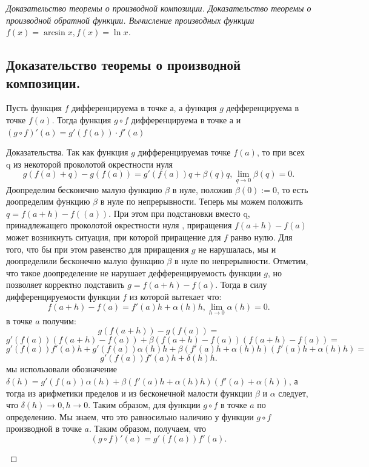 
\label{sec_Proofs06}
\begin{proof}[Доказательство теоремы о производной композиции. Доказательство теоремы о производной обратной функции. Вычисление производных функции $f(x) = \arcsin x, f(x) = \ln x$]
    \subsection*{Доказательство теоремы о производной композиции.}
    \begin{note}[amber]
        Пусть функция $f$ дифференцируема в точке а, а функция $g$ дефференцируема в точке $f(a)$. Тогда функция $g \circ f$ дифференцируема в точке а и $(g \circ f)'(a) = g'(f(a)) \cdot f'(a)$\\
        \begin{note}[purple]
           Доказательства. Так как функция $g$ дифференцируемав точке $f(a)$, то при всех q из некоторой проколотой окрестности нуля
           \[
           g(f(a) + q) - g(f(a)) = g'(f(a))q + \beta (q)q, \lim_{q \to 0} \beta(q) = 0.
           \]
           Доопределим бесконечно малую функцию $\beta$ в нуле, положив $\beta(0) := 0$, то есть доопределим функцию $\beta$
           в нуле по непрерывности. Теперь мы можем положить $q = f(a+h) - f((a))$. При этом при подстановки вместо q, принадлежащего проколотой окрестности нуля , приращения $f(a+h)-f(a)$ может возникнуть ситуация, при которой приращение для $f$ ранво нулю.
           Для того, что бы при этом равенство для приращения $g$ не нарушалась, мы и доопределили бесконечно малую функцию $\beta$ в нуле по непрерывности. Отметим, что такое доопределение не нарушает дефференцируемость функции $g$,
           но позволяет корректно подставить $g = f(a+h)-f(a)$.
           Тогда в силу дифференцируемости функции $f$ из которой вытекает что:
           \[
           f(a+h)-f(a) = f'(a)h + \alpha(h)h, \lim_{h \to 0} \alpha(h) = 0.
           \]
           в точке $a$ получим:
           \[
            g(f(a+h))-g(f(a)) = 
            \]
            \[
            g'(f(a))(f(a+h)-f(a)) + \beta(f(a+h)-f(a))(f(a+h)-f(a)) =
            \]
            \[
            g'(f(a))f'(a)h+g'(f(a))\alpha(h)h+\beta(f'(a)h+\alpha(h)h)(f'(a)h+\alpha(h)h) =
            \]
            \[
            g'(f(a))f'(a)h + \delta (h)h.
           \]
           мы использовали обозначение $\delta(h) = g'(f(a))\alpha(h) + \beta(f'(a)h + \alpha(h)h)(f'(a) + \alpha(h))$,
           а тогда из арифметики пределов и из бесконечной малости функции $\beta$ и $\alpha$ следует, что $\delta(h) \rightarrow 0, h \rightarrow 0$. Таким образом, для функции $g \circ f$ в точке $a$ по определению. 
           Мы знаем, что это равносильно наличию у функции $g \circ f$ производной в точке $a$. Таким образом, получаем, что
           \[
            (g \circ f)'(a) = g'(f(a))f'(a).
           \]
        \end{note}
    \end{note}


\end{proof}
